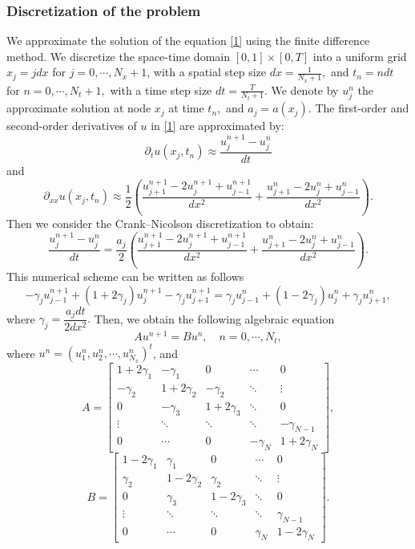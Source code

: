 \documentclass[reqno]{amsart}
\theoremstyle{plain}
\theoremstyle{remark}
\numberwithin{equation}{section}
\begin{document}
\subsubsection{\textbf{Discretization of the problem}}
We approximate the solution of the equation \eqref{1} using the finite difference method. We discretize the space-time domain $[0,1]\times [0,T]$ into a uniform grid $x_{j}=jdx $ for $j=0,\cdots, N_x+1$, with a spatial step size $dx=\frac{1}{N_x+1},$ and $t_n=ndt$ for $n=0,\cdots , N_t+1,$ with a time step size $dt=\frac{T}{N_t+1}$. We denote by $ u^n_{j}$ the approximate solution at node $x_{j}$ at time $t_n,$ and  $ a_{j}=a(x_{j}) $. The first-order and second-order derivatives of $u $ in \eqref{1} are approximated  by:
$$ \partial_t u (x_j,t_n) \approx  \frac{u_{j}^{n+1}-u_{j}^{n}}{dt} $$
and 
$$\partial_{xx}u (x_j,t_n) \approx \frac{1}{2}\left(\frac{u_{j+1}^{n+1}-2u_j^{n+1}+u_{j-1}^{n+1}}{dx^2}+\frac{u_{j+1}^{n}-2u_j^{n}+u_{j-1}^{n}}{dx^2}\right). $$
Then we consider the Crank–Nicolson discretization to obtain:
$$ \frac{u_{j}^{n+1}-u_{j}^{n}}{dt} = \frac{a_{j}}{2}\left(\frac{u_{j+1}^{n+1}-2u_j^{n+1}+u_{j-1}^{n+1}}{dx^2}+\frac{u_{j+1}^{n}-2u_j^{n}+u_{j-1}^{n}}{dx^2}\right).$$
This numerical scheme can be written as follows
$$-\gamma_ju_{j-1}^{n+1}+(1+2\gamma_j)u_j^{n+1}-\gamma_ju_{j+1}^{n+1}=\gamma_ju_{j-1}^n+ (1-2\gamma_j)u_j^n+\gamma_ju^n_{j+1},$$
where $\gamma_j=\dfrac{a_j dt}{2dx^2}.$ Then, we obtain the following algebraic equation
$$ Au^{n+1}=Bu^{n}, \quad n=0,\cdots, N_t,$$
where $u^n=(u^n_1, u_2^n,\cdots, u_{N_x}^n)^t$, and
$$A=\begin{bmatrix}
1 + 2\gamma_1 & -\gamma_1 & 0 & \cdots & 0 \\
-\gamma_2 & 1 + 2\gamma_2& -\gamma_2 & \ddots & \vdots \\
0 & -\gamma_3 & 1 + 2\gamma_3 & \ddots & 0 \\
\vdots & \ddots & \ddots & \ddots & -\gamma_{N-1} \\
0 & \cdots & 0 & -\gamma_{N} & 1 + 2\gamma_N
\end{bmatrix},
$$     
$$B=\begin{bmatrix}
1 - 2\gamma_1 & \gamma_1 & 0 & \cdots & 0 \\
\gamma_2 & 1 - 2\gamma_2& \gamma_2 & \ddots & \vdots \\
0 & \gamma_3 & 1 - 2\gamma_3 & \ddots & 0 \\
\vdots & \ddots & \ddots & \ddots & \gamma_{N-1} \\
0 & \cdots & 0 & \gamma_{N} & 1 - 2\gamma_N
\end{bmatrix}.
$$    
\end{document}
